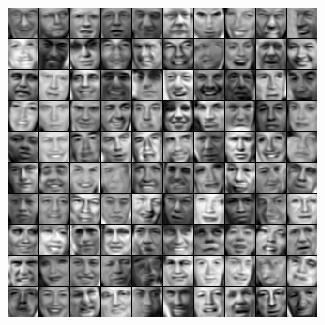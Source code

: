 \begin{adjmulticols}{1}{0in}{-2in}
\begin{center}
\begin{minipage}{0.45\textwidth}
\includegraphics[width=\linewidth]{./images/faces_rec}
\end{minipage}
\end{center}



\end{adjmulticols}
